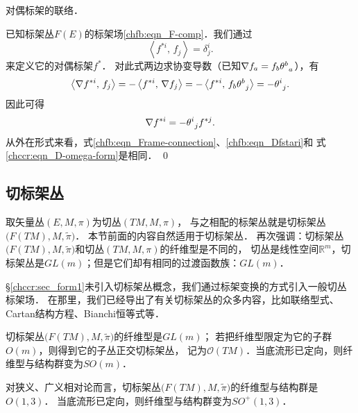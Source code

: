\begin{example}
    对偶标架的联络．
\end{example}
已知标架丛$F(E)$的标架场\eqref{chfb:eqn_F-comp}．我们通过
\begin{equation}
    \left< f^{*i} ,\, f_j\right> =\delta^i_j .
\end{equation}
来定义它的对偶标架$f^{*}$．
对此式两边求协变导数（已知$\nabla f_a  =f_b \theta_{\hphantom{a}a}^{b}$），有
\begin{equation}
    \left< \nabla f^{*i} ,\, f_j\right> = - \left< f^{*i} ,\, \nabla f_j\right>
    =- \left< f^{*i} ,\, f_b \theta_{\hphantom{a}j}^{b} \right>
    =- \theta_{\hphantom{j}j}^{i}.
\end{equation} 
因此可得
\begin{equation}\label{chfb:eqn_Dfstari}
    \nabla f^{*i}=- \theta_{\hphantom{j}j}^{i} f^{*j} .
\end{equation}
从外在形式来看，式\eqref{chfb:eqn_Frame-connection}、\eqref{chfb:eqn_Dfstari}和
式\eqref{chccr:eqn_D-omega-form}是相同．
\qed







\subsection{切标架丛}\label{chfb:sec_tangent-frame-bundles}

取矢量丛$(E,M,\pi)$为切丛$(TM,M,\pi)$，
与之相配的标架丛就是切标架丛$\bigl(F(TM),M,\tilde{\pi}\bigr)$．
本节前面的内容自然适用于切标架丛．
再次强调：切标架丛$\bigl(F(TM),M,\tilde{\pi}\bigr)$和切丛$(TM,M,\pi)$的纤维型是不同的，
切丛是线性空间$\mathbb{R}^m$，切标架丛是$GL(m)$；但是它们却有相同的过渡函数族：$GL(m)$．



\S\ref{chccr:sec_form1}未引入切标架丛概念，我们通过标架变换的方式引入一般切丛标架场．
在那里，我们已经导出了有关切标架丛的众多内容，比如联络型式、Cartan结构方程、Bianchi恒等式等．

切标架丛$\bigl(F(TM),M,\tilde{\pi}\bigr)$的纤维型是$GL(m)$；
若把纤维型限定为它的子群$O(m)$，则得到它的子丛{\heiti 正交切标架丛}，
记为$\mathcal{O}(TM)$．当底流形已定向，则纤维型与结构群变为$SO(m)$．

对狭义、广义相对论而言，切标架丛$\bigl(F(TM),M,\tilde{\pi}\bigr)$的纤维型与结构群是$O(1,3)$．
当底流形已定向，则纤维型与结构群变为$SO^{+}(1,3)$．



